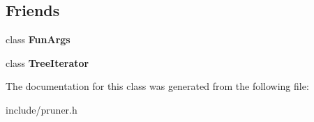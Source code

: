 \subsection*{Friends}
\begin{DoxyCompactItemize}
\item 
class {\bfseries Fun\+Args}\hypertarget{classpruner_1_1Tree_a667d4fbc407b7cce57e87064b934f905}{}\label{classpruner_1_1Tree_a667d4fbc407b7cce57e87064b934f905}

\item 
class {\bfseries Tree\+Iterator}\hypertarget{classpruner_1_1Tree_a925e5a7f5dc110e63f7062d0e6898af9}{}\label{classpruner_1_1Tree_a925e5a7f5dc110e63f7062d0e6898af9}

\end{DoxyCompactItemize}


The documentation for this class was generated from the following file\+:\begin{DoxyCompactItemize}
\item 
include/pruner.\+h\end{DoxyCompactItemize}
